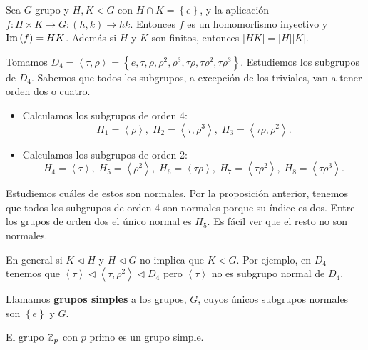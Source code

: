 \begin{observation}
	Sea $\displaystyle G $ grupo y $\displaystyle H,K \lhd G $ con $\displaystyle H \cap K = \left\{ e\right\}  $, y la aplicación $\displaystyle f : H \times K \to G : \left(h,k\right) \to hk $. Entonces $\displaystyle f $ es un homomorfismo inyectivo y $\displaystyle \operatorname{Im}\left(f\right) = HK $. Además si $\displaystyle H $ y $\displaystyle K $ son finitos, entonces $\displaystyle \left|HK\right| = \left|H\right| \left|K\right| $. 
\end{observation}
\begin{eg}
	Tomamos $\displaystyle D_{4} = \left\langle \tau, \rho \right\rangle = \left\{ e, \tau, \rho, \rho^{2}, \rho^{3}, \tau\rho, \tau\rho^{2}, \tau\rho^{3}\right\} $. Estudiemos los subgrupos de $\displaystyle D_{4} $. Sabemos que todos los subgrupos, a excepción de los triviales, van a tener orden dos o cuatro. 
	\begin{itemize}
	\item Calculamos los subgrupos de orden 4:
		\[H_{1} = \left\langle \rho \right\rangle, \; H_{2} = \left\langle \tau, \rho^{3} \right\rangle , \; H_{3} = \left\langle \tau\rho, \rho^{2} \right\rangle  .\]
	\item Calculamos los subgrupos de orden 2:
		\[H_{4} = \left\langle \tau \right\rangle , \; H_{5} = \left\langle \rho^{2} \right\rangle , \; H_{6} = \left\langle \tau \rho \right\rangle , \; H_{7} = \left\langle \tau\rho^{2} \right\rangle , \; H_{8} = \left\langle \tau\rho^{3} \right\rangle  .\]
	\end{itemize}
	Estudiemos cuáles de estos son normales. Por la proposición anterior, tenemos que todos los subgrupos de orden 4 son normales porque su índice es dos. Entre los grupos de orden dos el único normal es $\displaystyle H_{5} $. Es fácil ver que el resto no son normales. 
\end{eg}
\begin{observation}
En general si $\displaystyle K \lhd H$ y $\displaystyle H \lhd G $ no implica que $\displaystyle K\lhd G $. Por ejemplo, en $\displaystyle D_{4} $ tenemos que $\displaystyle \left\langle \tau \right\rangle \lhd \left\langle \tau, \rho^{2} \right\rangle \lhd D_{4} $ pero $\displaystyle \left\langle \tau \right\rangle  $ no es subgrupo normal de $\displaystyle D_{4} $. 
\end{observation}
\begin{definition}
	Llamamos \textbf{grupos simples} a los grupos, $\displaystyle G $, cuyos únicos subgrupos normales son $\displaystyle \left\{ e\right\}  $ y $\displaystyle G $. 
\end{definition}
\begin{eg}
El grupo $\displaystyle \mathbb{Z}_{p} $ con $\displaystyle p $ primo es un grupo simple.
\end{eg}
